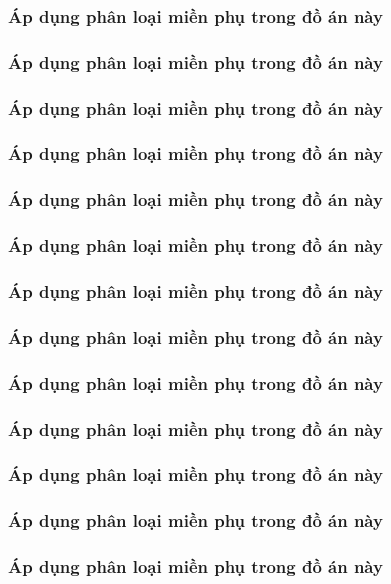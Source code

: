 



\subsubsection{Áp dụng phân loại miền phụ trong đồ án này}
\subsubsection{Áp dụng phân loại miền phụ trong đồ án này}
\subsubsection{Áp dụng phân loại miền phụ trong đồ án này}
\subsubsection{Áp dụng phân loại miền phụ trong đồ án này}
\subsubsection{Áp dụng phân loại miền phụ trong đồ án này}
\subsubsection{Áp dụng phân loại miền phụ trong đồ án này}
\subsubsection{Áp dụng phân loại miền phụ trong đồ án này}
\subsubsection{Áp dụng phân loại miền phụ trong đồ án này}
\subsubsection{Áp dụng phân loại miền phụ trong đồ án này}
\subsubsection{Áp dụng phân loại miền phụ trong đồ án này}
\subsubsection{Áp dụng phân loại miền phụ trong đồ án này}
\subsubsection{Áp dụng phân loại miền phụ trong đồ án này}
\subsubsection{Áp dụng phân loại miền phụ trong đồ án này}
